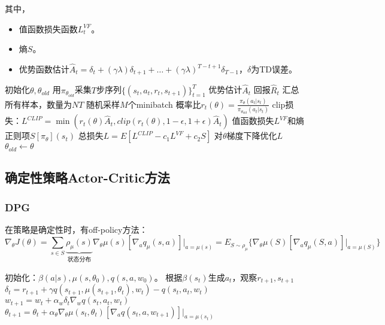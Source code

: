 \documentclass[
12pt, %
a4paper, 
oneside, %
headinclude,footinclude, %
]{scrartcl}
\begin{document}
其中，
\begin{itemize}
\item 值函数损失函数$ L_t^{VF} $。
\item 熵$ S $。
\item 优势函数估计$ \hat{A}_t = \delta_t + (\gamma\lambda)\delta_{t + 1} + \dots + (\gamma\lambda)^{T - t + 1}\delta_{T - 1} $，$ \delta $为TD误差。
\end{itemize}
\begin{myalgorithm}[PPO]
\State 初始化$ \theta, \theta_{old} $
\State 用$ \pi_{\theta_{old}} $采集$ T $步序列$ \{(s_t, a_t, r_t, s_{t + 1})\}_{t = 1}^T $
\State 优势估计$ \hat{A}_t $
\State 回报$ \hat{R}_t $
\EndFor
\State 汇总所有样本，数量为$ NT $
\State 随机采样$ M $个minibatch
\State 概率比$ r_t(\theta) = \frac{\pi_\theta(a_t|s_t)}{\pi_{\theta_{old}}(a_t|s_t)} $
\State clip损失：$ L^{CLIP} = \min(r_t(\theta)\hat{A}_t, clip(r_t(\theta), 1 - \epsilon, 1 + \epsilon)\hat{A}_t) $
\State 值函数损失$ L^{VF} $和熵正则项$ S[\pi_\theta](s_t) $
\State 总损失$ L = E[L^{CLIP} - c_1 L^{VF} + c_2 S] $
\State 对$ \theta $梯度下降优化$ L $
\EndFor
\State $ \theta_{old} \gets \theta $
\EndFor
\end{myalgorithm}
\subsection[确定性策略Actor-Critic方法]{确定性策略Actor-Critic方法}
\subsubsection[DPG]{DPG}
在策略是确定性时，有off-policy方法：
$$ \nabla_\theta J(\theta) = \sum_{s \in S} \underbrace{\rho_\mu(s)}_{\text{状态分布}} \nabla_\theta \mu(s)[\nabla_a q_\mu(s, a)]\bigg|_{a = \mu(s)} = E_{S \sim \rho_\mu}\{\nabla_\theta \mu(S)[\nabla_a q_\mu(S, a)]\bigg|_{a =\mu(S)}\} $$
\begin{myalgorithm}
\State 初始化：$ \beta(a|s), \mu(s, \theta_0), q(s, a, w_0) $。
\State 根据$ \beta(s_t) $生成$ a_t $，观察$ r_{t + 1}, s_{t + 1} $
\State $ \delta_t = r_{t + 1} + \gamma q(s_{t + 1}, \mu(s_{t + 1}, \theta_t), w_t) - q(s_t, a_t, w_t) $ 
\State $ w_{t + 1} = w_t + \alpha_w \delta_t \nabla_w q(s_t, a_t, w_t) $ 
\State $ \theta_{t + 1} = \theta_t + \alpha_\theta \nabla_\theta \mu(s_t, \theta_t)[\nabla_a q(s_t, a, w_{t + 1})]|_{a = \mu(s_t)} $ 
\EndFor
\EndFor
\end{myalgorithm}
\end{document}
